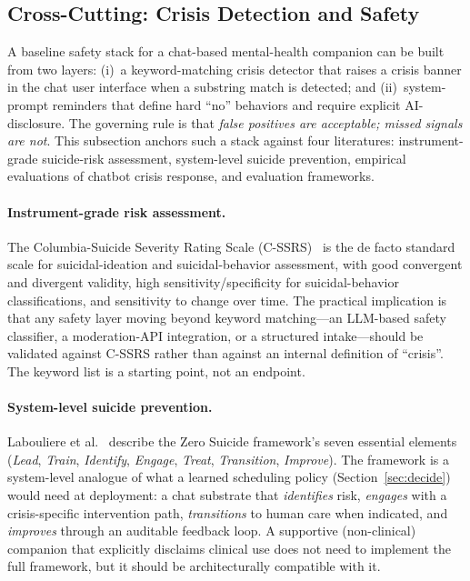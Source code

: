 \documentclass[11pt,a4paper]{article}
\newcommand{\secref}[1]{Section~\ref{#1}}
\begin{document}
\subsection{Cross-Cutting: Crisis Detection and Safety}\label{sec:safety}

A baseline safety stack for a chat-based mental-health companion
can be built from two layers: (i)~a keyword-matching crisis
detector that raises a crisis banner in the chat user interface
when a substring match is detected; and (ii)~system-prompt
reminders that define hard ``no'' behaviors and require explicit
AI-disclosure. The governing rule is that \emph{false positives
are acceptable; missed signals are not}. This subsection anchors
such a stack against four literatures: instrument-grade
suicide-risk assessment, system-level suicide prevention,
empirical evaluations of chatbot crisis response, and evaluation
frameworks.

\paragraph{Instrument-grade risk assessment.}
The Columbia-Suicide Severity Rating Scale
(C-SSRS)~\cite{Posner2011CSSRS} is the de facto standard scale for
suicidal-ideation and suicidal-behavior assessment, with good
convergent and divergent validity, high sensitivity/specificity
for suicidal-behavior classifications, and sensitivity to change
over time. The practical implication is that any safety layer
moving beyond keyword matching---an LLM-based safety classifier, a
moderation-API integration, or a structured intake---should be
validated against C-SSRS rather than against an internal definition
of ``crisis''. The keyword list is a starting point, not an
endpoint.

\paragraph{System-level suicide prevention.}
Labouliere et al.~\cite{Labouliere2018ZeroSuicide} describe the
Zero Suicide framework's seven essential elements (\emph{Lead},
\emph{Train}, \emph{Identify}, \emph{Engage}, \emph{Treat},
\emph{Transition}, \emph{Improve}). The framework is a
system-level analogue of what a learned scheduling policy
(\secref{sec:decide}) would need at deployment: a chat substrate
that \emph{identifies} risk, \emph{engages} with a crisis-specific
intervention path, \emph{transitions} to human care when indicated,
and \emph{improves} through an auditable feedback loop. A
supportive (non-clinical) companion that explicitly disclaims
clinical use does not need to implement the full framework, but it
should be architecturally compatible with it.
\end{document}
